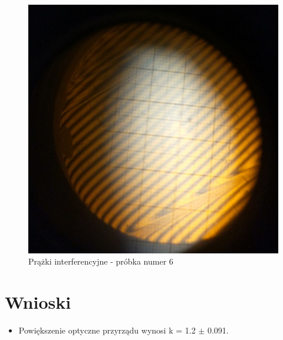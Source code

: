 \documentclass[12pt, a4paper, oneside]{article}
\begin{document}
\clearpage
\begin{figure}[h]
\centering
\caption{Prążki interferencyjne - próbka numer 6}
\includegraphics[scale=.4129]{pics/f7.png}
\end{figure}
\clearpage
\section{Wnioski}
\begin{itemize}
\item Powiększenie optyczne przyrządu wynosi k = 1.2 $\pm$ 0.091.
\end{itemize}
\end{document}
